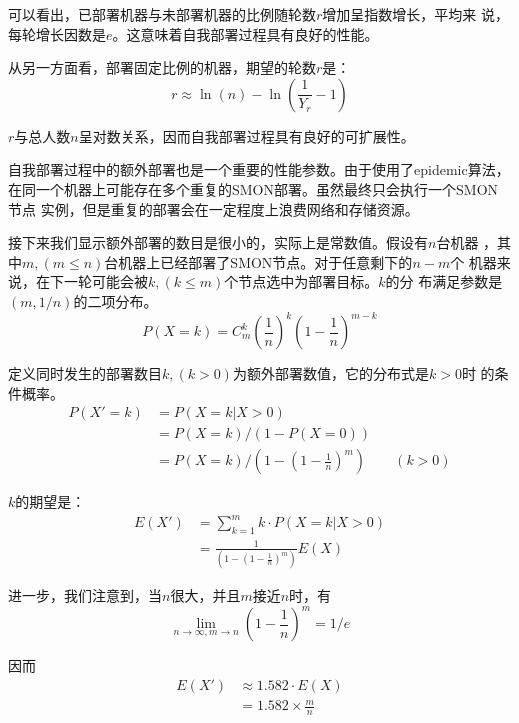 可以看出，已部署机器与未部署机器的比例随轮数$r$增加呈指数增长，平均来
说，每轮增长因数是$e$。这意味着自我部署过程具有良好的性能。

从另一方面看，部署固定比例的机器，期望的轮数$r$是：
\begin{equation*}
r \approx \ln(n) - \ln(\frac{1}{Y_r} - 1)
\end{equation*}

$r$与总人数$n$呈对数关系，因而自我部署过程具有良好的可扩展性。

自我部署过程中的额外部署也是一个重要的性能参数。由于使用了epidemic算法，
在同一个机器上可能存在多个重复的SMON部署。虽然最终只会执行一个SMON节点
实例，但是重复的部署会在一定程度上浪费网络和存储资源。

接下来我们显示额外部署的数目是很小的，实际上是常数值。假设有$n$台机器
，其中$m, (m \le n)$台机器上已经部署了SMON节点。对于任意剩下的$n-m$个
机器来说，在下一轮可能会被$k, (k \le m)$个节点选中为部署目标。$k$的分
布满足参数是$(m, 1/n)$的二项分布。
\begin{equation*}
P(X=k) = C_m^k (\frac{1}{n})^k (1 - \frac{1}{n})^{m - k}
\end{equation*}

定义同时发生的部署数目$k, (k > 0) $为额外部署数值，它的分布式是$k>0$时
的条件概率。
\begin{equation*}
\begin{aligned}
P(X' = k) &= P(X=k | X > 0) \\
&= P(X = k) / (1 - P(X = 0)) \\ 
&= P(X = k) / (1 - (1 - \frac{1}{n})^{m}) \qquad (k > 0)
\end{aligned}
\end{equation*}

$k$的期望是：
\begin{equation*}
\begin{aligned}
E(X') &= \sum_{k=1}^m k \cdot P(X=k|X>0)  \\
      &= \frac{1}{(1 - (1 - \frac{1}{n})^{m})} E(X)
\end{aligned}
\end{equation*}

进一步，我们注意到，当$n$很大，并且$m$接近$n$时，有
\begin{equation*}
\lim_{n \to \infty, m \to n} (1 - \frac{1}{n})^{m} = 1 / e
\end{equation*}

因而
\begin{equation*}
\begin{aligned}
E(X') &\approx 1.582 \cdot E(X) \\
      &= 1.582 \times \frac{m}{n}
\end{aligned}
\end{equation*}

